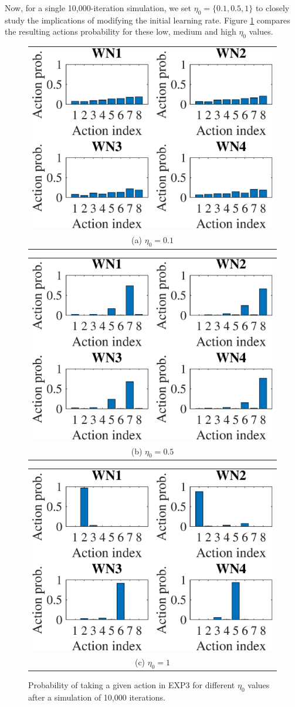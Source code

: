 \documentclass[10pt,journal,compsoc]{IEEEtran}
\begin{document}
	Now, for a single 10,000-iteration simulation, we set $\eta_0 = \{0.1, 0.5, 1\}$ to closely study the implications of modifying the initial learning rate. Figure \ref{fig:exp3_actions_distr} compares the resulting actions probability for these low, medium and high $\eta_0$ values.
	\begin{figure}
		\centering
		\begin{tabular}{@{}c@{}}
			\includegraphics[width=.25\textwidth]{images/NEW_actions_probability_EXP3_eta01} \\[\abovecaptionskip]
			\small (a) $\eta_0 = 0.1$
			\label{fig:exp3_eta01_actions_distr}
		\end{tabular}	
		\hspace{\floatsep}	
		\begin{tabular}{@{}c@{}}
			\includegraphics[width=.25\textwidth]{images/NEW_actions_probability_EXP3_eta05} \\[\abovecaptionskip]
			\small (b) $\eta_0 = 0.5$
			\label{fig:exp3_eta05_actions_distr}
		\end{tabular}
		\hspace{\floatsep}
		\begin{tabular}{@{}c@{}}
			\includegraphics[width=.25\textwidth]{images/NEW_actions_probability_EXP3_eta1} \\[\abovecaptionskip]
			\small (c) $\eta_0 = 1$
			\label{fig:exp3_eta1_actions_distr}
		\end{tabular}
		\caption{Probability of taking a given action in EXP3 for different $\eta_0$ values after a simulation of 10,000 iterations.}
		\label{fig:exp3_actions_distr}
	\end{figure}
	
\end{document}
